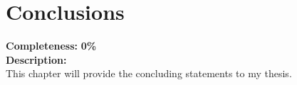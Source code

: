 \chapter{Conclusions}
\label{ch:conclusions}

\textbf{Completeness:} \textbf{0\%} \\


\textbf{Description:} \\
This chapter will provide the concluding statements to my thesis.

